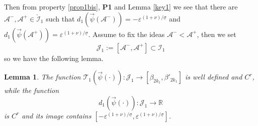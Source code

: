 \documentclass[10pt]{article}
\numberwithin{equation}{section}
\def\ep{\varepsilon}
\def\R{{\mathbb R}}
\def\TTT{\mathscr{T}}
\newcommand\assump[1]{{\rm\textbf{#1}}}
\newtheorem{lemma}[theorem]{Lemma}
\theoremstyle{definition}
\theoremstyle{remark}
\begin{document}
Then from  property \eqref{prop1bis},  \assump{P1} and   Lemma \ref{key1}   we see that there are $\mathcal{A}^-, \mathcal{A}^+ \in \mathcal{\check{I}}_1$ such that
$d_1(\vec{\psi}(\mathcal{A}^-))=-\ep^{(1+\nu)/\underline{\sigma}}$ and
$d_1(\vec{\psi}(\mathcal{A}^+))=\ep^{(1+\nu)/\underline{\sigma}}$. Assume to fix the ideas $\mathcal{A}^-<\mathcal{A}^+$, then we set
\begin{equation}\label{J1ebis}
  \mathcal{J}_1:=[\mathcal{A}^-,\mathcal{A}^+] \subset \mathcal{I}_1
\end{equation}
so we have the following lemma.
\begin{lemma}
The function $ \TTT_1(\vec{\psi}(\cdot)): \mathcal{J}_1 \to  [\beta_{2k_1}   , \beta'_{2k_1}]$
is well defined and $C^r$, while the function
$$ d_1(\vec{\psi}(\cdot)): \mathcal{J}_1 \to  \R$$
is  $C^r$ and its image contains $[-\ep^{(1+\nu)/ \underline{\sigma}} , \ep^{(1+\nu)/ \underline{\sigma}}]$.
\end{lemma}
\end{document}
